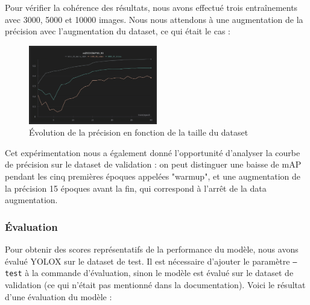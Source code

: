 Pour vérifier la cohérence des résultats, nous avons effectué trois entraînements avec 3000, 5000
et 10000 images. Nous nous attendons à une augmentation de la précision avec l'augmentation du dataset,
ce qui était le cas :

\begin{figure}[H]
    \centering
    \includegraphics[width=0.5\textwidth]{./img/dataset_size.png}
    \caption{Évolution de la précision en fonction de la taille du dataset}
\end{figure}

Cet expérimentation nous a également donné l'opportunité d'analyser la courbe de précision sur le dataset
de validation : on peut distinguer une baisse de mAP pendant les cinq premières époques appelées "warmup",
et une augmentation de la précision 15 époques avant la fin, qui correspond à l'arrêt de la data augmentation.\\

\subsubsection{Évaluation}

Pour obtenir des scores représentatifs de la performance du modèle, nous avons évalué YOLOX
sur le dataset de test. Il est nécessaire d'ajouter le paramètre \texttt{--test} à la commande
d'évaluation, sinon le modèle est évalué sur le dataset de validation (ce qui n'était pas mentionné
dans la documentation). Voici le résultat d'une évaluation du modèle :

